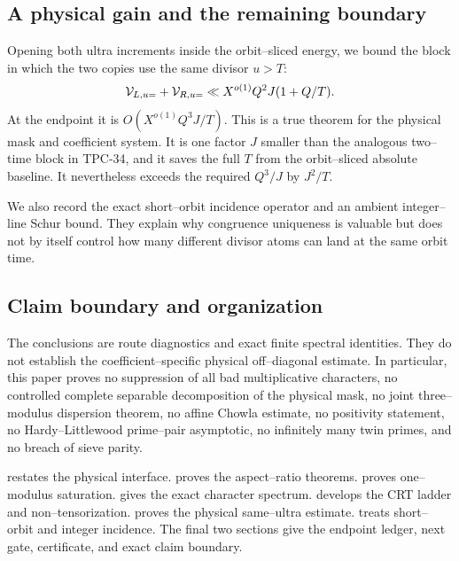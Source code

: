 \subsection{A physical gain and the remaining boundary}

Opening both ultra increments inside the orbit--sliced energy, we bound
the block in which the two copies use the same divisor \(u>T\):
\begin{equation}
 \mathcal V_{L,u=}+\mathcal V_{R,u=}
 \ll X^{o(1)}Q^2J(1+Q/T).
 \label{eq:tpc35-intro-physical-ultra}
\end{equation}
At the endpoint it is \(O(X^{o(1)}Q^3J/T)\).  This is a true theorem for
the physical mask and coefficient system.  It is one factor \(J\) smaller
than the analogous two--time block in TPC-34, and it saves the full \(T\)
from the orbit--sliced absolute baseline.  It nevertheless exceeds the
required \(Q^3/J\) by \(J^2/T\).

We also record the exact short--orbit incidence operator and an ambient
integer--line Schur bound.  They explain why congruence uniqueness is
valuable but does not by itself control how many different divisor atoms
can land at the same orbit time.

\subsection{Claim boundary and organization}

The conclusions are route diagnostics and exact finite spectral
identities.  They do not establish the coefficient--specific physical
off--diagonal estimate.  In particular, this paper proves no suppression
of all bad multiplicative characters, no controlled complete separable
decomposition of the physical mask, no joint three--modulus dispersion
theorem, no affine Chowla estimate, no positivity statement, no
Hardy--Littlewood prime--pair asymptotic, no infinitely many twin primes,
and no breach of sieve parity.

 restates the physical interface.
 proves the aspect--ratio theorems.
 proves one--modulus saturation.
 gives the exact character spectrum.
 develops the CRT ladder and non--tensorization.
 proves the physical same--ultra estimate.
 treats short--orbit and integer
incidence.  The final two sections give the endpoint ledger, next gate,
certificate, and exact claim boundary.
